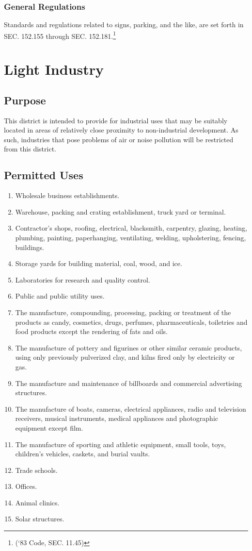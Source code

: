 \subsubsection{General Regulations}
Standards and regulations related to signs, parking, and the like, are set forth in SEC. 152.155 through SEC. 152.181.\footnote{(‘83 Code, SEC. 11.45)}

\section{Light Industry}
\subsection{Purpose}
This district is intended to provide for industrial uses that may be suitably located in areas of relatively close proximity to non-industrial development. As such, industries that pose problems of air or noise pollution will be restricted from this district.
\subsection{Permitted Uses}
\begin{enumerate}[{\indent}1)]
    \item Wholesale business establishments.
    \item Warehouse, packing and crating establishment, truck yard or terminal.
    \item Contractor’s shops, roofing, electrical, blacksmith, carpentry, glazing, heating, plumbing, painting, paperhanging, ventilating, welding, upholstering, fencing, buildings.
    \item Storage yards for building material, coal, wood, and ice.
    \item Laboratories for research and quality control.
    \item Public and public utility uses.
    \item The manufacture, compounding, processing, packing or treatment of the products as candy, cosmetics, drugs, perfumes, pharmaceuticals, toiletries and food products except the rendering of fats and oils.
    \item The manufacture of pottery and figurines or other similar ceramic products, using only previously pulverized clay, and kilns fired only by electricity or gas.
    \item The manufacture and maintenance of billboards and commercial advertising structures.
    \item The manufacture of boats, cameras, electrical appliances, radio and television receivers, musical instruments, medical appliances and photographic equipment except film.
    \item The manufacture of sporting and athletic equipment, small tools, toys, children’s vehicles, caskets, and burial vaults.
    \item Trade schools.
    \item Offices.
    \item Animal clinics.
    \item Solar structures.
\end{enumerate}
